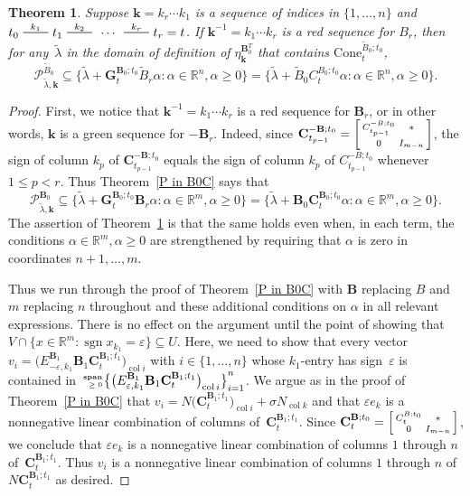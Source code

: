 \documentclass[10pt]{article}
\newtheorem{theorem}[proposition]{Theorem}
\theoremstyle{definition}
\theoremstyle{remark}
\numberwithin{equation}{section}
\newcommand{\reals}{\mathbb R}
\newcommand{\edge}{\,\,\rule[2.7pt]{20pt}{0.5pt}\,\,}
\newcommand{\ep}{\varepsilon}
\newcommand{\col}{\operatorname{col}}
\newcommand{\sgn}{\operatorname{sgn}}
\newcommand{\nnspan}{{\!\!\tiny\begin{array}{r}\mathbf{span}\\\ge0\end{array}\hspace*{-0.57em}}}
\newcommand{\set}[1]{{\lbrace #1 \rbrace}}
\newcommand{\sett}[1]{{\bigl\lbrace #1 \bigr\rbrace}}
\newcommand{\GG}{{\mathbf G}}
\newcommand{\CC}{{\mathbf C}}
\newcommand{\0}{{\mathbf{0}}}
\newcommand{\Cone}{\mathrm{Cone}}
\newcommand{\kk}{{\boldsymbol{k}}}
\newcommand{\tB}{{\widetilde{B}}}
\newcommand{\BB}{\mathbf{B}}
\renewcommand{\P}{\mathcal{P}}
\begin{document}
\begin{theorem}\label{P in B0C extended}
Suppose $\kk=k_r\cdots k_1$ is a sequence of indices in $\set{1,\ldots, n}$ and $t_0\overset{k_1}{\edge}t_1\overset{k_2}{\edge}\,\cdots\,\overset{k_r}{\edge}t_r=t$.
If $\kk^{-1}=k_1\cdots k_r$ is a red sequence for $B_r$, then for any~$\tilde\lambda$ in the domain of definition of $\eta_\kk^{\BB_0^T}$ that contains $\Cone^{\tB_0;t_0}_t$,
\[\P^{\tB_0}_{\tilde\lambda,\kk}\subseteq\set{\tilde\lambda+\GG_t^{\BB_0;t_0}\tB_r\alpha:\alpha\in\reals^n,\alpha\ge0}=\set{\tilde\lambda+\tB_0C_t^{B_0;t_0}\alpha:\alpha\in\reals^n,\alpha\ge0}.\]
\end{theorem}
\begin{proof}
First, we notice that $\kk^{-1}=k_1\cdots k_r$ is a red sequence for $\BB_r$, or in other words, $\kk$ is a green sequence for $-\BB_r$.
Indeed, since $\CC_{t_{p-1}}^{-\BB;t_0}=\begin{bsmallmatrix}C_{t_{p-1}}^{-B;t_0}&*\\\\0&I_{m-n}\end{bsmallmatrix}$, the sign of column $k_p$ of $\CC_{t_{p-1}}^{-\BB;t_0}$ equals the sign of column $k_p$ of $C_{t_{p-1}}^{-B;t_0}$ whenever $1\le p<r$.
Thus Theorem~\ref{P in B0C} says that
\[\P^{\BB_0}_{\tilde\lambda,\kk}\subseteq\set{\tilde\lambda+\GG_t^{\BB_0;t_0}\BB_r\alpha:\alpha\in\reals^m,\alpha\ge0}=\set{\tilde\lambda+\BB_0\CC_t^{\BB_0;t_0}\alpha:\alpha\in\reals^m,\alpha\ge0}.\]
The assertion of Theorem~\ref{P in B0C extended} is that the same holds even when, in each term, the conditions $\alpha\in\reals^m,\alpha\ge0$ are strengthened by requiring that $\alpha$ is zero in coordinates $n+1,\ldots,m$.

Thus we run through the proof of Theorem~\ref{P in B0C} with $\BB$ replacing $B$ and $m$ replacing $n$ throughout and these additional conditions on $\alpha$ in all relevant expressions.
There is no effect on the argument until the point of showing that $V\cap\set{x\in\reals^m:\sgn x_{k_1}=\ep}\subseteq U$.
Here, we need to show that every vector $v_i=\bigl(E^{\BB_1}_{-\ep,k_1}\BB_1\CC_t^{\BB_1;t_1}\bigr)_{\col i}$ with $i\in\set{1,\ldots,n}$ whose $k_1$-entry has sign~$\ep$ is contained in $\nnspan\sett{\bigl(E^{\BB_1}_{\ep,k_1}\BB_1\CC_t^{\BB_1;t_1}\bigr)_{\col i}}_{i=1}^n$.
We argue as in the proof of Theorem~\ref{P in B0C} that $v_i=N\bigl(\CC_t^{\BB_1;t_1}\bigr)_{\col i}+\sigma N_{\col k}$ and that $\ep e_k$ is a nonnegative linear combination of columns of~$\CC_t^{\BB_1;t_1}$.
Since $\CC_t^{\BB;t_0}=\begin{bsmallmatrix}C_t^{B;t_0}&*\\0&I_{m-n}\end{bsmallmatrix}$, we conclude that $\ep e_k$ is a nonnegative linear combination of columns $1$ through $n$ of~$\CC_t^{\BB_1;t_1}$.
Thus $v_i$ is a nonnegative linear combination of columns $1$ through $n$ of~$N\CC_t^{\BB_1;t_1}$ as desired.
\end{proof}
\end{document}
